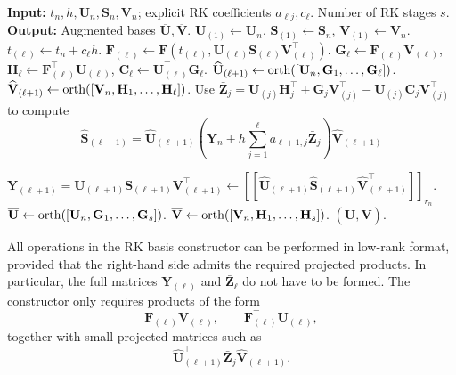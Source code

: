 \documentclass[preprint,runningheads]{svjour3}
\def\wh{\widehat}
\def\wt{\widetilde}
\def\wt{\overline}
\newcommand\bfC{{\mathbf C}}
\newcommand\bfF{{\mathbf F}}
\newcommand\bfG{{\mathbf G}}
\newcommand\bfH{{\mathbf H}}
\newcommand\bfS{{\mathbf S}}
\newcommand\bfU{{\mathbf U}}
\newcommand\bfV{{\mathbf V}}
\newcommand\bfY{{\mathbf Y}}
\newcommand\bfZ{{\mathbf Z}}
\begin{document}
\begin{algorithm}[t]
\caption{RK basis constructor for BUG-$p$}
\label{alg:rk_basis_constructor_bug_form}
\begin{algorithmic}[1]
\State \textbf{Input:}
$t_n,h,\bfU_n,\bfS_n,\bfV_n$; explicit RK coefficients $a_{\ell j},c_\ell$.  Number of RK stages $s$.
\State \textbf{Output:}
Augmented bases $\wt\bfU,\wt\bfV$.
\State
$\bfU_{(1)}\gets\bfU_n$,
$\bfS_{(1)}\gets\bfS_n$,
$\bfV_{(1)}\gets\bfV_n$.
    \State
    $t_{(\ell)}\gets t_n+c_\ell h$.
    \State
    $\bfF_{(\ell)}
    \gets
    \bfF(t_{(\ell)},
    \bfU_{(\ell)}\bfS_{(\ell)}\bfV_{(\ell)}^\top)$.
    \State
    $\bfG_\ell\gets\bfF_{(\ell)}\bfV_{(\ell)}$,
    $\bfH_\ell\gets\bfF_{(\ell)}^\top\bfU_{(\ell)}$,
    $\bfC_\ell\gets\bfU_{(\ell)}^\top\bfG_\ell$.
        \State
        $\wh\bfU_{(\ell+1)}
        \gets
        {\rm orth}([\bfU_n,\bfG_1,\ldots,\bfG_\ell])$.
        \State
        $\wh\bfV_{(\ell+1)}
        \gets
        {\rm orth}([\bfV_n,\bfH_1,\ldots,\bfH_\ell])$.
        \State
        Use  $
            \bar\bfZ_j
            =
            \bfU_{(j)}\bfH_j^\top
            +
            \bfG_j\bfV_{(j)}^\top
            -
            \bfU_{(j)}\bfC_j\bfV_{(j)}^\top
       $ to compute
        \[
            \wh\bfS_{(\ell+1)}
            =
            \wh\bfU_{(\ell+1)}^\top
            \left(
                \bfY_n
                +
                h\sum_{j=1}^{\ell}a_{\ell+1,j}\bar\bfZ_j
            \right)
            \wh\bfV_{(\ell+1)}
        \]

        \State
        $\bfY_{(\ell+1)}
        =
        \bfU_{(\ell+1)}
        \bfS_{(\ell+1)}
        \bfV_{(\ell+1)}^\top
        \gets
        [\![
        \wh\bfU_{(\ell+1)}
        \wh\bfS_{(\ell+1)}
        \wh\bfV_{(\ell+1)}^\top
        ]\!]_{r_n}$.
    \EndIf
\EndFor
\State
$\wt\bfU\gets{\rm orth}([\bfU_n,\bfG_1,\ldots,\bfG_s])$.
\State
$\wt\bfV\gets{\rm orth}([\bfV_n,\bfH_1,\ldots,\bfH_s])$.
\State
\Return $(\wt\bfU,\wt\bfV)$.
\end{algorithmic}
\end{algorithm}


\begin{remark}
All operations in the RK basis constructor can be performed in low-rank format,
provided that the right-hand side admits the required projected products. In
particular, the full matrices $\bfY_{(\ell)}$ and $\bar\bfZ_\ell$ do not have to
be formed. The constructor only requires products of the form
\[
    \bfF_{(\ell)}\bfV_{(\ell)},\qquad
    \bfF_{(\ell)}^\top\bfU_{(\ell)},
\]
together with small projected matrices such as
\[
    \wh\bfU_{(\ell+1)}^\top
    \bar\bfZ_j
    \wh\bfV_{(\ell+1)} .
\]

\end{remark}
\end{document}
